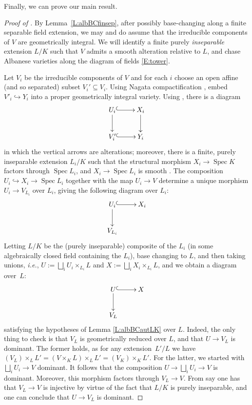 \documentclass[11pt, reqno]{amsart}
\numberwithin{equation}{section}
\theoremstyle{definition}
\theoremstyle{remark}
\DeclareMathOperator{\spec}{Spec}
\begin{document}
                                                




 Finally, we can prove our main result.


 \begin{proof}[Proof of ]
 	By Lemma~\ref{L:albBCfinsep}, after possibly base-changing along a finite separable field extension,  we may and do assume that the irreducible components of $V$ are geometrically integral.  
   We will identify a finite purely \emph{inseparable} extension $L/K$ such that $V$ admits a smooth alteration relative to $L$, and chase Albanese varieties along the diagram of fields \eqref{E:tower}.
           

  Let $V_i$ be the irreducible components of $V$ and for each $i$ choose an open affine (and so separated) subset $V_i'\subseteq V_i$.
  Using Nagata compactification \cite{conradNagata}, embed $V'_i \hookrightarrow Y_i$
  into a
  proper geometrically integral variety.  Using \cite[Thm.~4.1]{deJong}, there is a
  diagram
  \[
  \xymatrix{
   U_i \ar[d] \ar@{^{(}->}[r] & X_i \ar[d] \\
   V'_i  \ar@{^{(}->}[r] & Y_i
  }
  \]
  in which the vertical arrows are alterations;  moreover, there is a
  finite, purely inseparable extension $L_i/K$ such that the structural morphism $X_i
  \to \spec K$ factors through $\spec L_i$, and $X_i \to \spec L_i$ is
  smooth \cite[Rem.~4.2]{deJong}. 
 The composition $U_i\hookrightarrow X_i \to \operatorname{Spec}L_i$ together with the map $U_i\to V$ determine a unique morphism $U_i\to V_{L_i}$ over $L_i$,   
 giving the following diagram over $L_i$:
    \[
  \xymatrix{
   U_i \ar[d] \ar@{^{(}->}[r] & X_i  \\
   V_{L_i}
  }
  \] 
  Letting $L/K$ be the (purely inseparable) composite of the $L_i$ (in some algebraically closed field containing the $L_i$), base changing to $L$, and then taking unions, \emph{i.e.},  $U := \bigsqcup_i U_i\times_{L_i}L$ and $X:= \bigsqcup_i X_i\times_{L_i} L$,  
  and we obtain a diagram over~$L$:
  \begin{equation}\label{E:UVLX}
  \xymatrix{
   U \ar[d] \ar@{^{(}->}[r] & X  \\
   V_L
  }
  \end{equation}
satisfying the hypotheses of Lemma
  \ref{L:albBCautLK} over $L$.  Indeed, the only thing to check is that $V_L$ is geometrically reduced over $L$, and that $U\to V_L$ is dominant.  The former holds, as for any extension~$L'/L$ we have $(V_L)\times_L L'= (V\times_KL)\times_L L'= (V_K)\times_KL'$.  For the latter, we started with $\bigsqcup_i U_i\to V$ dominant.  
It follows that the composition $U\to \bigsqcup_i U_i\to V$ is dominant.  Moreover, this morphism factors through $V_L\to V$.  
  From say \cite[Prop.~4.35, p.111]{GW20} one has that $V_L\to V$ is injective by virtue of the fact that  $L/K$ is purely inseparable, and one can conclude that $U\to V_L$ is dominant.  


\end{proof}
\end{document}
